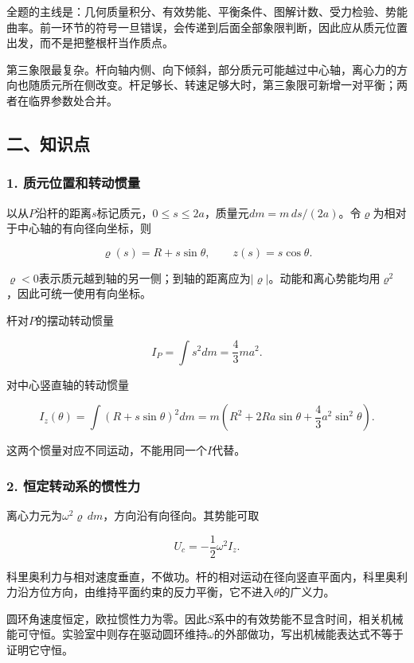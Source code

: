 \documentclass[12pt,a4paper,fontset=fandol]{ctexart}
\begin{document}
全题的主线是：几何质量积分、有效势能、平衡条件、图解计数、受力检验、势能曲率。前一环节的符号一旦错误，会传递到后面全部象限判断，因此应从质元位置出发，而不是把整根杆当作质点。

第三象限最复杂。杆向轴内侧、向下倾斜，部分质元可能越过中心轴，离心力的方向也随质元所在侧改变。杆足够长、转速足够大时，第三象限可新增一对平衡；两者在临界参数处合并。

\subsection{二、知识点}\label{ux4e8cux77e5ux8bc6ux70b9-3}

\subsubsection{1.
质元位置和转动惯量}\label{ux8d28ux5143ux4f4dux7f6eux548cux8f6cux52a8ux60efux91cf}

以从\(P\)沿杆的距离\(s\)标记质元，\(0\leq s\leq2a\)，质量元\(dm=m\,ds/(2a)\)。令\(\varrho\)为相对于中心轴的有向径向坐标，则

\[
\varrho(s)=R+s\sin\theta,\qquad z(s)=s\cos\theta.
\]

\(\varrho<0\)表示质元越到轴的另一侧；到轴的距离应为\(|\varrho|\)。动能和离心势能均用\(\varrho^2\)，因此可统一使用有向坐标。

杆对\(P\)的摆动转动惯量

\[
I_P=\int s^2dm=\frac43ma^2.
\]

对中心竖直轴的转动惯量

\[
I_z(\theta)=\int(R+s\sin\theta)^2dm
=m\left(R^2+2Ra\sin\theta+\frac43a^2\sin^2\theta\right).
\]

这两个惯量对应不同运动，不能用同一个\(I\)代替。

\subsubsection{2.
恒定转动系的惯性力}\label{ux6052ux5b9aux8f6cux52a8ux7cfbux7684ux60efux6027ux529b}

离心力元为\(\omega^2\varrho\,dm\)，方向沿有向径向。其势能可取

\[
U_c=-\frac12\omega^2 I_z.
\]

科里奥利力与相对速度垂直，不做功。杆的相对运动在径向竖直平面内，科里奥利力沿方位方向，由维持平面约束的反力平衡，它不进入\(\theta\)的广义力。

圆环角速度恒定，欧拉惯性力为零。因此\(S\)系中的有效势能不显含时间，相关机械能可守恒。实验室中则存在驱动圆环维持\(\omega\)的外部做功，写出机械能表达式不等于证明它守恒。
\end{document}
